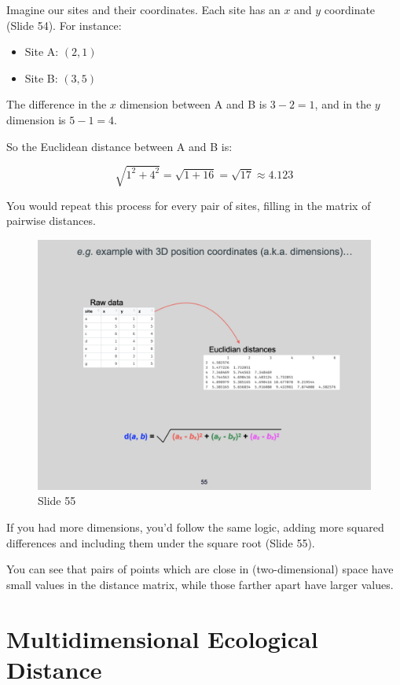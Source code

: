 \documentclass[
  11pt,
]{book}
\providecommand{\tightlist}{%
  \setlength{\itemsep}{0pt}\setlength{\parskip}{0pt}}
\begin{document}
Imagine our sites and their coordinates. Each site has an \(x\) and
\(y\) coordinate (Slide 54). For instance:

\begin{itemize}
\tightlist
\item
  Site A: \((2, 1)\)
\item
  Site B: \((3, 5)\)
\end{itemize}

The difference in the \(x\) dimension between A and B is \(3 - 2 = 1\),
and in the \(y\) dimension is \(5 - 1 = 4\).

So the Euclidean distance between A and B is:

\[
\sqrt{1^2 + 4^2} = \sqrt{1 + 16} = \sqrt{17} \approx 4.123
\]

You would repeat this process for every pair of sites, filling in the
matrix of pairwise distances.

\begin{figure}[ht]
\centering
\includegraphics[width=0.8\linewidth]{../images/BDC334/BDC334-055.jpeg}
\caption*{Slide 55}
\end{figure}

If you had more dimensions, you'd follow the same logic, adding more
squared differences and including them under the square root (Slide 55).

You can see that pairs of points which are close in (two-dimensional)
space have small values in the distance matrix, while those farther
apart have larger values.

\section{Multidimensional Ecological
Distance}\label{multidimensional-ecological-distance}
\end{document}

